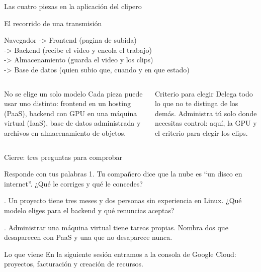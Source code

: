 \documentclass[aspectratio=169,10pt,c]{beamer}
\begin{document}
\begin{frame}{Las cuatro piezas en la aplicación del clipero}
\begin{exampleblock}{El recorrido de una transmisión}
\begin{terminal}\footnotesize
Navegador -> Frontend (pagina de subida)\\
\qquad\qquad -> Backend (recibe el video y encola el trabajo)\\
\qquad\qquad -> Almacenamiento (guarda el video y los clips)\\
\qquad\qquad -> Base de datos (quien subio que, cuando y en que estado)
\end{terminal}
\end{exampleblock}
\begin{columns}[T,onlytextwidth]
\begin{block}{No se elige un solo modelo}
\small Cada pieza puede usar uno distinto: frontend en un hosting (PaaS), backend con GPU en una máquina virtual (IaaS), base de datos administrada y archivos en almacenamiento de objetos.
\end{block}
\begin{alertblock}{Criterio para elegir}
\small Delega todo lo que no te distinga de los demás. Administra tú solo donde necesitas control: aquí, la GPU y el criterio para elegir los clips.
\end{alertblock}
\end{columns}
\end{frame}

\begin{frame}{Cierre: tres preguntas para comprobar}
\begin{block}{Responde con tus palabras}
\small
1. Tu compañero dice que la nube es ``un disco en internet''. ¿Qué le corriges y qué le concedes?\par{}. Un proyecto tiene tres meses y dos personas sin experiencia en Linux. ¿Qué modelo eliges para el backend y qué renuncias aceptas?\par{}. Administrar una máquina virtual tiene tareas propias. Nombra dos que desaparecen con PaaS y una que no desaparece nunca.
\end{block}
\begin{alertblock}{Lo que viene}
\small En la siguiente sesión entramos a la consola de Google Cloud: proyectos, facturación y creación de recursos.
\end{alertblock}
\end{frame}
\end{document}
